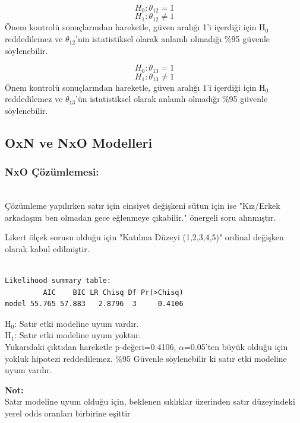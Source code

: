 \documentclass{article}
\begin{document}
\[
H_0: \theta_{12} = 1
\]
\[
H_1: \theta_{12} \neq 1
\]
Önem kontrolü sonuçlarından hareketle, güven aralığı 1’i içerdiği için H$_0$ reddedilemez ve $\theta_{12}$’nin istatistiksel olarak anlamlı olmadığı \%95 güvenle söylenebilir.

\[
H_0: \theta_{13} = 1
\]
\[
H_1: \theta_{13} \neq 1
\]
Önem kontrolü sonuçlarından hareketle, güven aralığı 1’i içerdiği için H$_0$ reddedilemez ve $\theta_{13}$’ün istatistiksel olarak anlamlı olmadığı \%95 güvenle söylenebilir.

\vspace{20pt}
\subsection{OxN ve NxO Modelleri}
\subsubsection{NxO Çözümlemesi:} \\
Çözümleme yapılırken satır için cinsiyet değişkeni sütun için ise "Kız/Erkek arkadaşım ben olmadan gece eğlenmeye çıkabilir." önergeli soru alınmıştır.

Likert ölçek sorusu olduğu için "Katılma Düzeyi (1,2,3,4,5)" ordinal değişken olarak kabul edilmiştir.

\begin{verbatim}
    
Likelihood summary table:
         AIC    BIC LR Chisq Df Pr(>Chisq)
model 55.765 57.883   2.8796  3     0.4106
\end{verbatim}

H$_0$: Satır etki modeline uyum vardır. \\
H$_1$: Satır etki modeline uyum yoktur. \\

Yukarıdaki çıktıdan hareketle p-değeri=0.4106, $\alpha$=0.05’ten büyük olduğu için yokluk hipotezi reddedilemez. \%95 Güvenle söylenebilir ki satır etki modeline uyum vardır.

\textbf{Not:} \\
Satır modeline uyum olduğu için, beklenen sıklıklar üzerinden satır düzeyindeki yerel odds oranları birbirine eşittir
\end{document}
